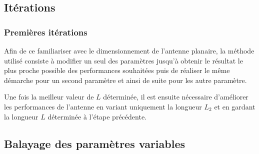\documentclass[Deriaz_Traiber_Labo02]{subfiles}
\begin{document}
\subsection{Itérations}
\subsubsection{Premières itérations}

Afin de ce familiariser avec le dimensionnement de l'antenne planaire, la méthode utilisé consiste à modifier un seul des paramètres jusqu'à obtenir le résultat le plus proche possible des performances souhaitées puis de réaliser le même démarche pour un second paramètre et ainsi de suite pour les autre paramètre.



Une fois la meilleur valeur de $L$ déterminée, il est ensuite nécessaire d'améliorer les performances de l'antenne en variant uniquement la longueur $L_2$ et en gardant la longueur $L$ déterminée à l'étape précédente.

\subsection{Balayage des paramètres variables}


\end{document}
